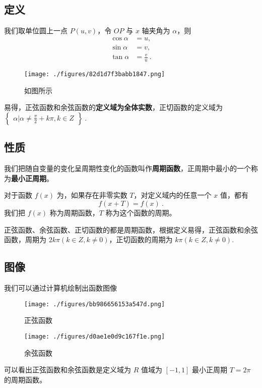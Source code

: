 \begin{issues}
\issueDraft
\end{issues}

\subsection{定义}
我们取单位圆上一点 $P(u,v)$，令 $OP$ 与 $x$ 轴夹角为 $\alpha$，则 
\begin{equation}
\begin{aligned}
\cos\alpha &= u,\\
\sin\alpha &= v,\\
\tan\alpha &= \frac{v}{u}~.
\end{aligned}
\end{equation}
\begin{figure}[ht]
\centering
\texttt{[image: ./figures/82d1d7f3babb1847.png]}
\caption{如图所示} \label{fig_HsTrFu_3}
\end{figure}
易得，正弦函数和余弦函数的\textbf{定义域为全体实数}，正切函数的定义域为 $\begin{Bmatrix}\alpha|\alpha \neq \frac{\pi}{2}+k\pi,k\in Z\end{Bmatrix}~.$

\subsection{性质}
我们把随自变量的变化呈周期性变化的函数叫作\textbf{周期函数}，正周期中最小的一个称为\textbf{最小正周期}。

对于函数 $f(x)$ 为，如果存在非零实数 $T$，对定义域内的任意一个 $x$ 值，都有
\begin{equation}
f(x+T) = f(x)~.
\end{equation}
我们把 $f(x)$ 称为周期函数，$T$ 称为这个函数的周期。

正弦函数、余弦函数、正切函数的都是周期函数，根据定义易得，正弦函数和余弦函数，周期为 $2k\pi(k\in Z,k\neq0)$，正切函数的周期为 $k\pi(k\in Z,k\neq0)$.

\subsection{图像}
我们可以通过计算机绘制出函数图像
\begin{figure}[ht]
\centering
\texttt{[image: ./figures/bb986656153a547d.png]}
\caption{正弦函数} \label{fig_HsTrFu_1}
\end{figure}
\begin{figure}[ht]
\centering
\texttt{[image: ./figures/d0ae1e0d9c167f1e.png]}
\caption{余弦函数} \label{fig_HsTrFu_2}
\end{figure}
可以看出正弦函数和余弦函数是定义域为 $R$ 值域为 $[-1,1]$ 最小正周期 $T = 2\pi$ 的周期函数。

